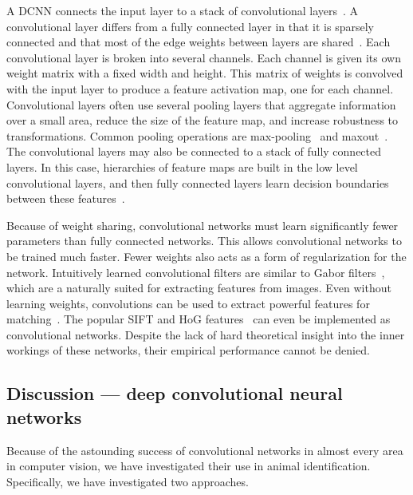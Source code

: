     A DCNN connects the input layer to a stack of convolutional layers~\cite{krizhevsky_imagenet_2012}. A
    convolutional layer differs from a fully connected layer in that it is sparsely connected and that most of the
    edge weights between layers are shared~\cite{lecun_gradient_based_1998, fukushima_neocognitron_1988,
    serre_robust_2007}. Each convolutional layer is broken into several channels. Each channel is given its own
    weight matrix with a fixed width and height. This matrix of weights is convolved with the input layer to
    produce a feature activation map, one for each channel. Convolutional layers often use several pooling layers
    that aggregate information over a small area, reduce the size of the feature map, and increase robustness to
    transformations. Common pooling operations are max-pooling~\cite{serre_robust_2007, krizhevsky_imagenet_2012}
    and maxout~\cite{goodfellow_maxout_2013}. The convolutional layers may also be connected to a stack of fully
    connected layers. In this case, hierarchies of feature maps are built in the low level convolutional layers,
    and then fully connected layers learn decision boundaries between these
    features~\cite{zeiler_visualizing_2014}.

    Because of weight sharing, convolutional networks must learn significantly fewer parameters than fully
      connected networks.
    This allows convolutional networks to be trained much faster.
    Fewer weights also acts as a form of regularization for the network.
    Intuitively learned convolutional filters are similar to Gabor filters~\cite{gabor_theory_1946}, which are a
      naturally suited for extracting features from images.
    Even without learning weights, convolutions can be used to extract powerful features for
      matching~\cite{revaud_deep_2015}.
    The popular SIFT and HoG features~\cite{mahendran_understanding_2015} can even be implemented as
      convolutional networks.
    Despite the lack of hard theoretical insight into the inner workings of these networks, their empirical
      performance cannot be denied.

  \subsection{Discussion --- deep convolutional neural networks}\label{subsec:dcnndiscuss}
        Because of the astounding success of convolutional networks in almost every area in computer vision, we have
        investigated their use in animal identification. Specifically, we have investigated two approaches.

